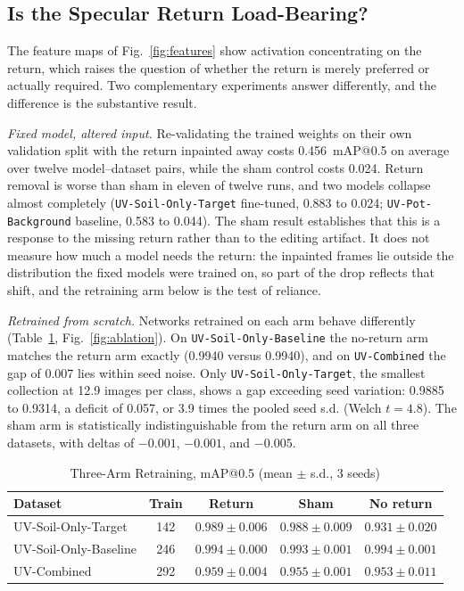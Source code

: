 ﻿\documentclass[journal]{IEEEtran}
\begin{document}
\subsection{Is the Specular Return Load-Bearing?}
\label{sec:ablation-results}
The feature maps of Fig.~\ref{fig:features} show activation concentrating on the return, which raises the question of whether the return is merely preferred or actually required. Two complementary experiments answer differently, and the difference is the substantive result.

\emph{Fixed model, altered input.} Re-validating the trained weights on their own validation split with the return inpainted away costs 0.456~mAP@0.5 on average over twelve model--dataset pairs, while the sham control costs 0.024. Return removal is worse than sham in eleven of twelve runs, and two models collapse almost completely (\texttt{UV-Soil-Only-Target} fine-tuned, 0.883 to 0.024; \texttt{UV-Pot-Background} baseline, 0.583 to 0.044). The sham result establishes that this is a response to the missing return rather than to the editing artifact. It does not measure how much a model needs the return: the inpainted frames lie outside the distribution the fixed models were trained on, so part of the drop reflects that shift, and the retraining arm below is the test of reliance.

\emph{Retrained from scratch.} Networks retrained on each arm behave differently (Table~\ref{tab:ablation}, Fig.~\ref{fig:ablation}). On \texttt{UV-Soil-Only-Baseline} the no-return arm matches the return arm exactly (0.9940 versus 0.9940), and on \texttt{UV-Combined} the gap of 0.007 lies within seed noise. Only \texttt{UV-Soil-Only-Target}, the smallest collection at 12.9 images per class, shows a gap exceeding seed variation: 0.9885 to 0.9314, a deficit of 0.057, or 3.9 times the pooled seed s.d. (Welch $t = 4.8$). The sham arm is statistically indistinguishable from the return arm on all three datasets, with deltas of $-0.001$, $-0.001$, and $-0.005$.

\begin{table}[!t]
\renewcommand{\arraystretch}{1.3}
\caption{Three-Arm Retraining, mAP@0.5 (mean $\pm$ s.d., 3 seeds)}
\label{tab:ablation}
\centering
\scriptsize
\setlength{\tabcolsep}{3pt}
\begin{tabular}{l c c c c}
\toprule
\textbf{Dataset} & \textbf{Train} & \textbf{Return} & \textbf{Sham} & \textbf{No return} \\
\midrule
UV-Soil-Only-Target & 142 & $0.989 \pm 0.006$ & $0.988 \pm 0.009$ & $0.931 \pm 0.020$ \\
UV-Soil-Only-Baseline & 246 & $0.994 \pm 0.000$ & $0.993 \pm 0.001$ & $0.994 \pm 0.001$ \\
UV-Combined & 292 & $0.959 \pm 0.004$ & $0.955 \pm 0.001$ & $0.953 \pm 0.011$ \\
\bottomrule
\end{tabular}
\end{table}
\end{document}
